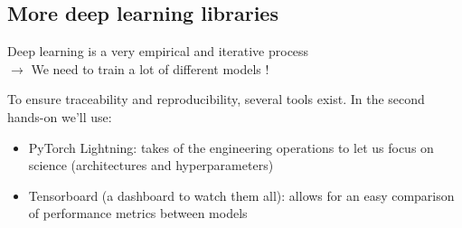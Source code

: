 \documentclass[usenames,dvipsnames]{beamer}
\begin{document}
    
    \subsection[DL libraries (sequel)]{More deep learning libraries}
    \begin{frame}{\secname}{\subsecname}
        Deep learning is a very empirical and iterative process\\ $\rightarrow$ We need to train a lot of different models !
        
        To ensure traceability and reproducibility, several tools exist. In the second hands-on we'll use:
        \begin{itemize}
            \item PyTorch Lightning: takes of the engineering operations to let us focus on science (architectures and hyperparameters)
            \item Tensorboard (a dashboard to watch them all): allows for an easy comparison of performance metrics between models
        \end{itemize}
    \end{frame}
    
\end{document}
